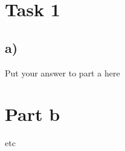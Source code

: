 \documentclass{article}
\begin{document}
\section*{Task 1}
\subsection*{a)}

Put your answer to part a here


\section*{Part b}

etc
\end{document}
